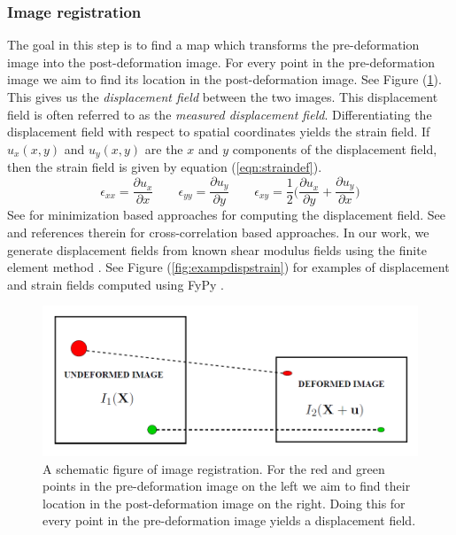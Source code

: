 \documentclass[12pt]{article}
\newcommand{\beq}{\begin{equation}}
\newcommand{\eeq}{\end{equation}}
\newcommand{\pdd}[2]{\frac{\partial{{#1}}}{\partial{#2}}}
\begin{document}
\subsubsection{Image registration} The goal in this step is to find a map which transforms the pre-deformation image into the post-deformation image. For every point in the pre-deformation image we aim to find its location in the post-deformation image. See Figure (\ref{fig:registschematic}). This gives us the \textit{displacement field} between the two images. This displacement field is often referred to as the \textit{measured displacement field}. Differentiating the displacement field with respect to spatial coordinates yields the strain field. If $u_x(x,y)$ and $u_{y}(x,y)$ are the $x$ and $y$ components of the displacement field, then the strain field is given by equation (\ref{eqn:straindef}).
\beq
\label{eqn:straindef}
\epsilon_{xx} = \pdd{u_{x}}{x} \qquad \epsilon_{yy} = \pdd{u_{y}}{y} \qquad \epsilon_{xy} = \frac{1}{2}\Big(\pdd{u_{x}}{y} + \pdd{u_{y}}{x}\Big)
\eeq
See \cite{paper:richards2009,paper:gokhale2004,paper:pellot-barakat2004} for minimization based approaches for computing the displacement field. See \cite{paper:ophir1991,paper:ophir1996,paper:alam1998} and references therein for cross-correlation based approaches. In our work, we generate displacement fields from known shear modulus fields using the finite element method \cite{book:hugheslinear,book:fishbelytschko}. See Figure (\ref{fig:exampdispstrain}) for examples of displacement and strain fields computed using FyPy \cite{misc:fypy}.
%
\begin{figure}[h]
  \centering
  \includegraphics[totalheight=4cm]{Figures/regist.png}
  \caption{\label{fig:registschematic} A schematic figure of image registration. For the red and green points in the pre-deformation image on the left we aim to find their location in the post-deformation image on the right. Doing this for every point in the pre-deformation image yields a displacement field.}
\end{figure}
\end{document}
